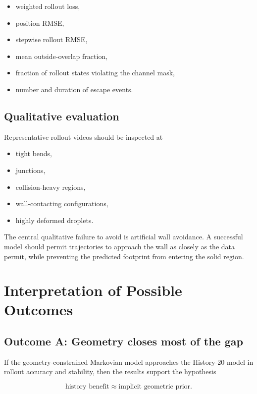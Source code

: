 \documentclass[11pt]{article}
\begin{document}
\begin{itemize}[leftmargin=1.5em]
    \item weighted rollout loss,
    \item position RMSE,
    \item stepwise rollout RMSE,
    \item mean outside-overlap fraction,
    \item fraction of rollout states violating the channel mask,
    \item number and duration of escape events.
\end{itemize}

\subsection{Qualitative evaluation}

Representative rollout videos should be inspected at

\begin{itemize}[leftmargin=1.5em]
    \item tight bends,
    \item junctions,
    \item collision-heavy regions,
    \item wall-contacting configurations,
    \item highly deformed droplets.
\end{itemize}

The central qualitative failure to avoid is artificial wall avoidance. A successful model should permit trajectories to approach the wall as closely as the data permit, while preventing the predicted footprint from entering the solid region.

\section{Interpretation of Possible Outcomes}

\subsection{Outcome A: Geometry closes most of the gap}

If the geometry-constrained Markovian model approaches the History-20 model in rollout accuracy and stability, then the results support the hypothesis

\begin{equation}
    \text{history benefit}
    \approx
    \text{implicit geometric prior}.
\end{equation}
\end{document}
